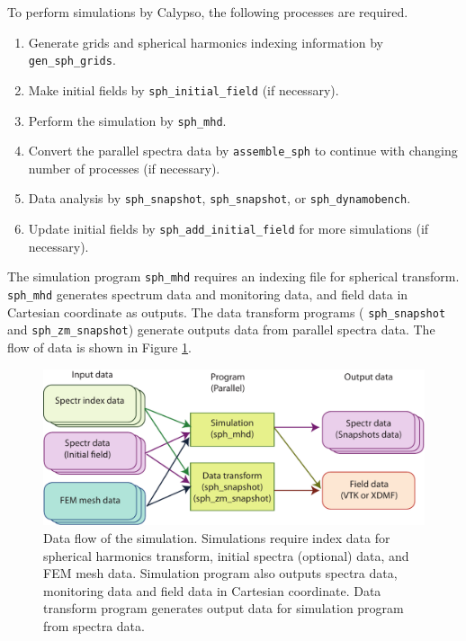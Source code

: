 %
To perform simulations by Calypso, the following processes are required.
%
\begin{enumerate}
\item Generate grids and spherical harmonics indexing information by \\
\verb|gen_sph_grids|.
\item Make initial fields by \verb|sph_initial_field| (if necessary). 
\item Perform the simulation by \verb|sph_mhd|.
\item Convert the parallel spectra data by \verb|assemble_sph| to continue with changing number of processes (if necessary).
\item Data analysis by \verb|sph_snapshot|, \verb|sph_snapshot|, or \verb|sph_dynamobench|.
\item Update initial fields by \verb|sph_add_initial_field| for more simulations (if necessary). 
\end{enumerate}
%
The simulation program \verb|sph_mhd| requires an indexing file for spherical transform.  \verb|sph_mhd| generates spectrum data and monitoring data, and field data in Cartesian coordinate as outputs. The data transform programs ( \verb|sph_snapshot| and \verb|sph_zm_snapshot|) generate outputs data  from parallel spectra data. The flow of data is shown in Figure \ref{fig:flow_0}. 
%
\begin{figure}[H]
\begin{center}
\includegraphics*[width=130mm]{images/flow_0}
\end{center}
\caption{Data flow of the simulation. Simulations require index data for spherical harmonics transform, initial spectra (optional) data, and FEM mesh data. Simulation program also outputs spectra data, monitoring data and  field data in Cartesian coordinate. Data transform program generates output data for simulation program from spectra data.}
\label{fig:flow_0}
\end{figure}
%

